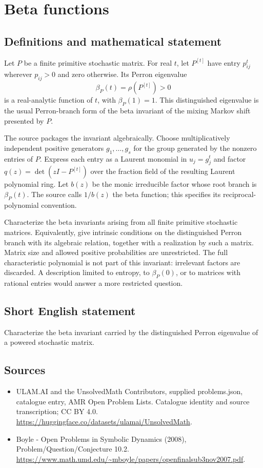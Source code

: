 \documentclass[11pt,a4paper]{article}
\begin{document}
\section*{Beta functions}\label{statement}

\subsection{Definitions and mathematical statement}
Let $P$ be a finite primitive stochastic matrix. For real $t$, let
$P^{[t]}$ have entry $p_{ij}^t$ wherever $p_{ij}>0$ and zero otherwise.
Its Perron eigenvalue
\[
 \beta_P(t)=\rho(P^{[t]})>0
\]
is a real-analytic function of $t$, with $\beta_P(1)=1$.
This distinguished eigenvalue is the usual Perron-branch form of the
beta invariant of the mixing Markov shift presented by $P$.

The source packages the invariant algebraically. Choose multiplicatively
independent positive generators $g_1,\ldots,g_s$ for the group generated
by the nonzero entries of $P$. Express each entry as a Laurent monomial
in $u_j=g_j^t$ and factor
$q(z)=\det(zI-P^{[t]})$ over the fraction field of the resulting Laurent
polynomial ring. Let $b(z)$ be the monic irreducible factor whose root
branch is $\beta_P(t)$. The source calls $1/b(z)$ the beta function;
this specifies its reciprocal-polynomial convention.

Characterize the beta invariants arising from all finite primitive
stochastic matrices. Equivalently, give intrinsic conditions on the
distinguished Perron branch with its algebraic relation, together with
a realization by such a matrix. Matrix size and allowed positive
probabilities are unrestricted. The full characteristic polynomial is
not part of this invariant: irrelevant factors are discarded. A
description limited to entropy, to $\beta_P(0)$, or to matrices with
rational entries would answer a more restricted question.
\subsection{Short English statement}
Characterize the beta invariant carried by the distinguished Perron eigenvalue of a powered stochastic matrix.
\subsection{Sources}
\begin{itemize}
\item[S1] ULAM.AI and the UnsolvedMath Contributors, supplied problems.json, catalogue entry, AMR Open Problem Lists. Catalogue identity and source transcription; CC BY 4.0.
\url{https://huggingface.co/datasets/ulamai/UnsolvedMath}.
\item[S2] Boyle - Open Problems in Symbolic Dynamics (2008), Problem/Question/Conjecture 10.2. 
\url{https://www.math.umd.edu/~mboyle/papers/openfinalsub3nov2007.pdf}.
\end{itemize}
\end{document}
